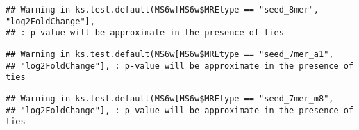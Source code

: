\documentclass[
]{article}
\newenvironment{Shaded}{\begin{snugshade}}{\end{snugshade}}
\newcommand{\FunctionTok}[1]{\textcolor[rgb]{0.13,0.29,0.53}{\textbf{#1}}}
\newcommand{\NormalTok}[1]{#1}
\newcommand{\OtherTok}[1]{\textcolor[rgb]{0.56,0.35,0.01}{#1}}
\newcommand{\SpecialCharTok}[1]{\textcolor[rgb]{0.81,0.36,0.00}{\textbf{#1}}}
\newcommand{\StringTok}[1]{\textcolor[rgb]{0.31,0.60,0.02}{#1}}
\begin{document}
\begin{verbatim}
## Warning in ks.test.default(MS6w[MS6w$MREtype == "seed_8mer", "log2FoldChange"],
## : p-value will be approximate in the presence of ties
\end{verbatim}

\begin{Shaded}
\end{Shaded}

\begin{verbatim}
## Warning in ks.test.default(MS6w[MS6w$MREtype == "seed_7mer_a1",
## "log2FoldChange"], : p-value will be approximate in the presence of ties
\end{verbatim}

\begin{Shaded}
\end{Shaded}

\begin{verbatim}
## Warning in ks.test.default(MS6w[MS6w$MREtype == "seed_7mer_m8",
## "log2FoldChange"], : p-value will be approximate in the presence of ties
\end{verbatim}

\begin{Shaded}
\end{Shaded}
\end{document}
